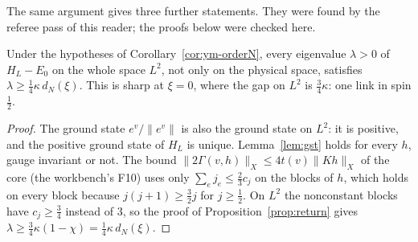 The same argument gives three further statements. They were found by the referee pass of this reader; the proofs below were checked here.

\begin{corollary}\label{cor:fullspace}
Under the hypotheses of Corollary~\ref{cor:ym-orderN}, every eigenvalue $\lambda>0$ of $H_L-E_0$ on the whole space $L^2$, not only on the physical space, satisfies $\lambda\ge\frac14\kappa\,d_N(\xi)$. This is sharp at $\xi=0$, where the gap on $L^2$ is $\frac34\kappa$: one link in spin $\frac12$.
\end{corollary}
\begin{proof}
The ground state $e^v/\|e^v\|$ is also the ground state on $L^2$: it is positive, and the positive ground state of $H_L$ is unique. Lemma~\ref{lem:gst} holds for every $h$, gauge invariant or not. The bound $\|2\Gamma(v,h)\|_X\le4t(v)\|Kh\|_X$ of the core (the workbench's F10) uses only $\sum_ej_e\le\frac23c_j$ on the blocks of $h$, which holds on every block because $j(j+1)\ge\frac32j$ for $j\ge\frac12$. On $L^2$ the nonconstant blocks have $c_j\ge\frac34$ instead of $3$, so the proof of Proposition~\ref{prop:return} gives $\lambda\ge\frac34\kappa(1-\chi)=\frac14\kappa\,d_N(\xi)$.
\end{proof}

